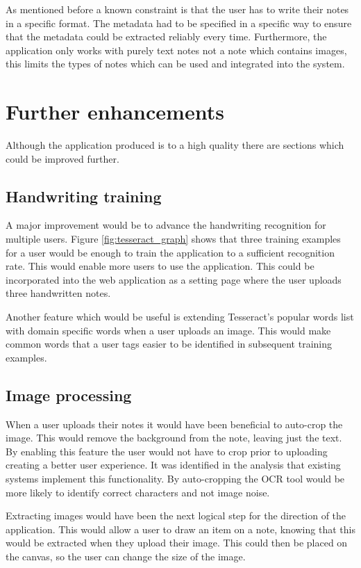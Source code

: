 As mentioned before a known constraint is that the user has to write their notes in a specific format. The metadata had to be specified in a specific way to ensure that the metadata could be extracted reliably every time. Furthermore, the application only works with purely text notes not a note which contains images, this limits the types of notes which can be used and integrated into the system.

\section{Further enhancements}
Although the application produced is to a high quality there are sections which could be improved further.
\subsection{Handwriting training}
A major improvement would be to advance the handwriting recognition for multiple users. Figure \ref{fig:tesseract_graph} shows that three training examples for a user would be enough to train the application to a sufficient recognition rate. This would enable more users to use the application. This could be incorporated into the web application as a setting page where the user uploads three handwritten notes.

Another feature which would be useful is extending Tesseract's popular words list with domain specific words when a user uploads an image. This would make common words that a user tags easier to be identified in subsequent training examples.
\subsection{Image processing}

When a user uploads their notes it would have been beneficial to auto-crop the image. This would remove the background from the note, leaving just the text. By enabling this feature the user would not have to crop prior to uploading creating a better user experience. It was identified in the analysis that existing systems implement this functionality. By auto-cropping the OCR tool would be more likely to identify correct characters and not image noise.

Extracting images would have been the next logical step for the direction of the application. This would allow a user to draw an item on a note, knowing that this would be extracted when they upload their image. This could then be placed on the canvas, so the user can change the size of the image.

